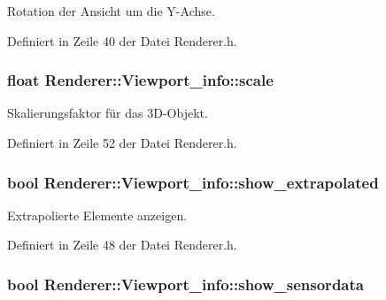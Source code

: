 Rotation der Ansicht um die Y-\/\-Achse. 



Definiert in Zeile 40 der Datei Renderer.\-h.

\hypertarget{structRenderer_1_1Viewport__info_a90128db9d24987d94ddd843646a4f03d}{
\subsubsection[{scale}]{\setlength{\rightskip}{0pt plus 5cm}float Renderer\-::\-Viewport\-\_\-info\-::scale}}\label{structRenderer_1_1Viewport__info_a90128db9d24987d94ddd843646a4f03d}


Skalierungsfaktor für das 3\-D-\/\-Objekt. 



Definiert in Zeile 52 der Datei Renderer.\-h.

\hypertarget{structRenderer_1_1Viewport__info_ac9d99216a6044d7048ba805f9f9b0815}{
\subsubsection[{show\-\_\-extrapolated}]{\setlength{\rightskip}{0pt plus 5cm}bool Renderer\-::\-Viewport\-\_\-info\-::show\-\_\-extrapolated}}\label{structRenderer_1_1Viewport__info_ac9d99216a6044d7048ba805f9f9b0815}


Extrapolierte Elemente anzeigen. 



Definiert in Zeile 48 der Datei Renderer.\-h.

\hypertarget{structRenderer_1_1Viewport__info_abd0ab0f20c5acc43128634b4b4cc1f52}{
\subsubsection[{show\-\_\-sensordata}]{\setlength{\rightskip}{0pt plus 5cm}bool Renderer\-::\-Viewport\-\_\-info\-::show\-\_\-sensordata}}\label{structRenderer_1_1Viewport__info_abd0ab0f20c5acc43128634b4b4cc1f52}


